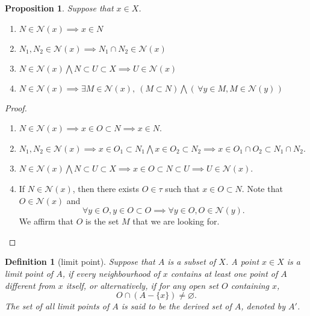 \documentclass{report}
\newtheorem{definition}{Definition}[section]
\newtheorem{proposition}{Proposition}[section]
\theoremstyle{nonumberplain}
\newtheorem{proof}{Proof.}
\begin{document}
\begin{proposition}
	Suppose that $x\in X$.
	\begin{enumerate}
		\item $N\in\mathcal{N}(x)\implies x\in N$
		\item $N_1,N_2\in\mathcal{N}(x)\implies N_1\cap N_2\in\mathcal{N}(x)$
		\item $N\in\mathcal{N}(x)\bigwedge N\subset U\subset X\implies U\in\mathcal{N}(x)$
		\item $N\in\mathcal{N}(x)\implies \exists M\in\mathcal{N}(x),\ (M\subset N)\bigwedge(\,\forall y\in M,M\in\mathcal{N}(y)\hspace{1pt})$
	\end{enumerate}
\end{proposition}
\begin{proof}~\\ \vspace{-1em}
	\begin{enumerate}
		\item $N\in\mathcal{N}(x)\implies x\in O\subset N \implies x\in N$.
		\item $N_1,N_2\in\mathcal{N}(x)\implies x\in O_1\subset N_1 \bigwedge x\in O_2\subset N_2\implies x\in O_1\cap O_2\subset N_1\cap N_2$.
		\item $N\in\mathcal{N}(x)\bigwedge N\subset U\subset X\implies x\in O\subset N\subset U\implies U\in\mathcal{N}(x)$.
		\item If $N\in\mathcal{N}(x)$, then there exists $O\in\tau$ such that $x\in O\subset N$. Note that $O\in \mathcal{N}(x)$ and
		      \[
			      \forall y\in O,y\in O\subset O\implies\forall y\in O,O\in\mathcal{N}(y).
		      \]
		      We affirm that $O$ is the set $M$ that we are looking for.
	\end{enumerate}
\end{proof}
\begin{definition}[limit point]
	Suppose that $A$ is a subset of $X$. A point $x\in X$ is a \emph{limit point} of $A$, if every neighbourhood of $x$ contains at least one point of $A$ different from $x$ itself,
	or alternatively, if for any open set $O$ containing $x$,
	\[
		O\cap(A-\{x\})\ne\varnothing.
	\]
	The set of all limit points of $A$ is said to be the \emph{derived set} of $A$, denoted by $A'$.
\end{definition}
\end{document}
